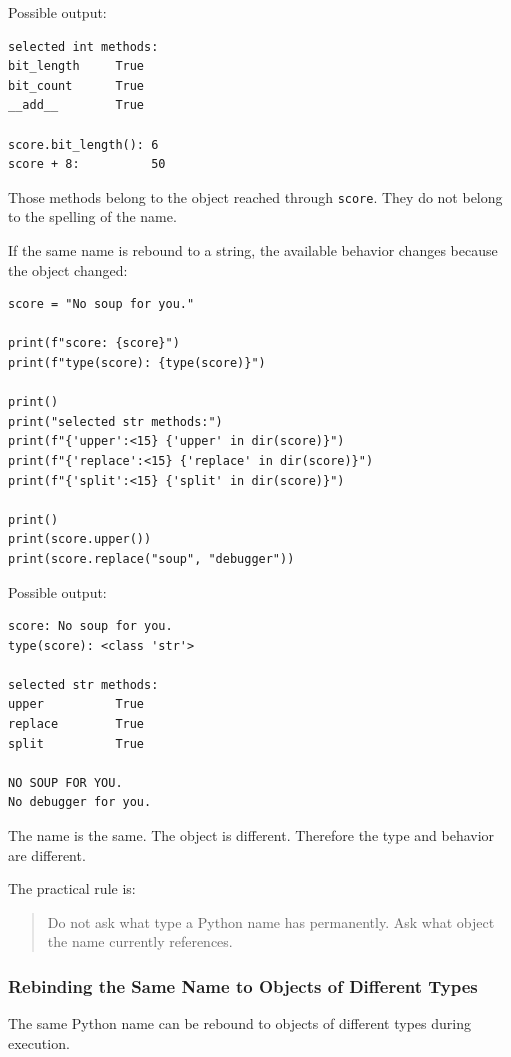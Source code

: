 Possible output:

\begin{verbatim}
selected int methods:
bit_length     True
bit_count      True
__add__        True

score.bit_length(): 6
score + 8:          50
\end{verbatim}

Those methods belong to the object reached through \texttt{score}. They do not belong to the spelling of the name.

If the same name is rebound to a string, the available behavior changes because the object changed:

\begin{verbatim}
score = "No soup for you."

print(f"score: {score}")
print(f"type(score): {type(score)}")

print()
print("selected str methods:")
print(f"{'upper':<15} {'upper' in dir(score)}")
print(f"{'replace':<15} {'replace' in dir(score)}")
print(f"{'split':<15} {'split' in dir(score)}")

print()
print(score.upper())
print(score.replace("soup", "debugger"))
\end{verbatim}

Possible output:

\begin{verbatim}
score: No soup for you.
type(score): <class 'str'>

selected str methods:
upper          True
replace        True
split          True

NO SOUP FOR YOU.
No debugger for you.
\end{verbatim}

The name is the same. The object is different. Therefore the type and behavior are different.

The practical rule is:

\begin{quote}
Do not ask what type a Python name has permanently. Ask what object the name currently references.
\end{quote}

\subsubsection{Rebinding the Same Name to Objects of Different Types}

The same Python name can be rebound to objects of different types during execution.

